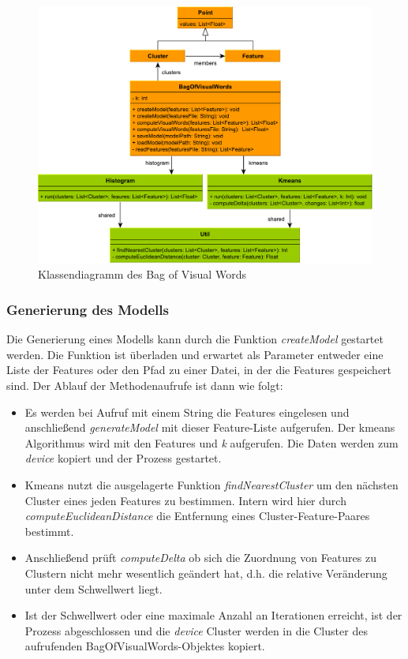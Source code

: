 \begin{figure}
	\centering
	\includegraphics[scale=0.57]{images/bovw_class.pdf}
	\caption{Klassendiagramm des Bag of Visual Words}
	\label{img:bovw_class}
\end{figure}
 
\subsubsection{Generierung des Modells}

Die Generierung eines Modells kann durch die Funktion \textit{createModel} gestartet werden. Die Funktion ist überladen und erwartet als Parameter entweder eine Liste der Features oder den Pfad zu einer Datei, in der die Features gespeichert sind. Der Ablauf der Methodenaufrufe ist dann wie folgt:

\begin{itemize}
	\item Es werden bei Aufruf mit einem String die Features eingelesen und anschließend \textit{generateModel} mit dieser Feature-Liste aufgerufen. Der kmeans Algorithmus wird mit den Features und \textit{k} aufgerufen. Die Daten werden zum \textit{device} kopiert und der Prozess gestartet. 
	\item Kmeans nutzt die ausgelagerte Funktion \textit{findNearestCluster} um den nächsten Cluster eines jeden Features zu bestimmen. Intern wird hier durch \textit{computeEuclideanDistance} die Entfernung eines Cluster-Feature-Paares bestimmt.
	\item Anschließend prüft \textit{computeDelta} ob sich die Zuordnung von Features zu Clustern nicht mehr wesentlich geändert hat, d.h. die relative Veränderung unter dem Schwellwert liegt.
	\item Ist der Schwellwert oder eine maximale Anzahl an Iterationen erreicht, ist der Prozess abgeschlossen und die \textit{device} Cluster werden in die Cluster des aufrufenden BagOfVisualWords-Objektes kopiert.
\end{itemize}
 
